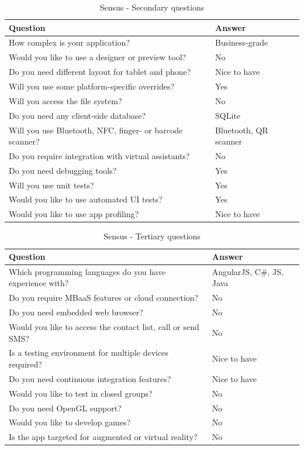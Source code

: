 \documentclass[english,master,public,dept460,male,cpdeclaration,oneside]{diploma}
\begin{document}
\begin{table}[!h]
	\centering
	\caption{Sensus - Secondary questions}
	\begin{tabular}{p{7.5cm} | p{5cm}}
		\toprule		
		\textbf{Question} &	\textbf{Answer} \\
		\midrule
		How complex is your application? & Business-grade \\
		Would you like to use a designer or preview tool? & No \\
		Do you need different layout for tablet and phone? & Nice to have \\
		Will you use some platform-specific overrides? & Yes \\
		Will you access the file system? & No \\
		Do you need any client-side database? & SQLite \\
		Will you use Bluetooth, NFC, finger- or barcode scanner? & Bluetooth, QR scanner \\
		Do you require integration with virtual assistants? & No \\
		Do you need debugging tools? & Yes \\
		Will you use unit tests? & Yes \\
		Would you like to use automated UI tests? & Yes \\
		Would you like to use app profiling? & Nice to have \\		
		\midrule
	\end{tabular}
\end{table}

\begin{table}[!h]
	\centering
	\caption{Sensus - Tertiary questions}
	\begin{tabular}{p{9.5cm} | p{3cm}}
		\toprule		
		\textbf{Question} &	\textbf{Answer} \\
		\midrule		
		Which programming languages do you have experience with? & AngularJS, C\#, JS, Java \\
		Do you require MBaaS features or cloud connection? & No \\
		Do you need embedded web browser? & No \\
		Would you like to access the contact list, call or send SMS? & No \\
		Is a testing environment for multiple devices required? & Nice to have \\
		Do you need continuous integration features? & Nice to have \\
		Would you like to test in closed groups? & No \\
		Do you need OpenGL support? & No \\
		Would you like to develop games? & No \\
		Is the app targeted for augmented or virtual reality? & No \\			
		\midrule
	\end{tabular}
\end{table}
\end{document}
